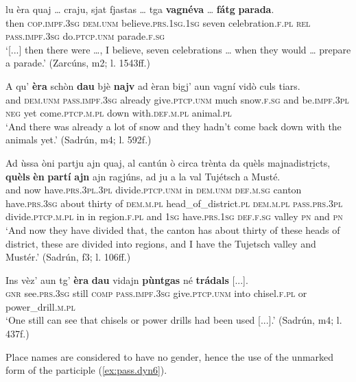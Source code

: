 \ea
\label{ex:pass.dyn5}
\gll    [...] lu èra quaj … craju, sjat fjastas … tga \textbf{vagnéva} … \textbf{fátg} \textbf{parada}.\\
{} then \textsc{cop.impf.3sg} \textsc{dem.unm} {} believe.\textsc{prs.1sg.1sg} seven celebration.\textsc{f.pl} {} \textsc{rel} \textsc{pass.impf.3sg} {} do.\textsc{ptcp.unm} parade.\textsc{f.sg}\\
\glt `[...] then there were …, I believe, seven celebrations … when they would … prepare a parade.' (Zarcúns, m2; l. 1543ff.)
\z

\ea
\label{ex:pass.stat1}
\gll A qu' \textbf{èra} schòn \textbf{dau} bjè \textbf{najv} ad èran bigj’ aun vagní vidò culs tiars.\\  
and \textsc{dem.unm} \textsc{pass.impf.3sg} already give.\textsc{ptcp.unm} much snow.\textsc{f.sg} and be.\textsc{impf.3pl} \textsc{neg} yet come.\textsc{ptcp.m.pl} down with.\textsc{def.m.pl} animal.\textsc{pl} \\
\glt `And there was already a lot of snow and they hadn’t come back down with the animals yet.' (Sadrún, m4; l. 592f.)
\z

\ea
\label{ex:pass.stat2}
\gll Ad ùssa òni partju ajn quaj, al cantún ò circa trènta da quèls majnadistri̱cts, \textbf{quèls} \textbf{èn} \textbf{partí} \textbf{ajn} ajn ragjúns, ad ju a la val Tujétsch a Musté.\\
and now have.\textsc{prs.3pl.3pl} divide.\textsc{ptcp.unm} in \textsc{dem.unm} \textsc{def.m.sg} canton  have.\textsc{prs.3sg} about thirty of \textsc{dem.m.pl} head\_of\_district.\textsc{pl} \textsc{dem.m.pl} \textsc{pass.prs.3pl} divide.\textsc{ptcp.m.pl} in in region.\textsc{f.pl} and \textsc{1sg} have.\textsc{prs.1sg} \textsc{def.f.sg} valley \textsc{pn} and \textsc{pn}\\
\glt `And now they have divided that, the canton has about thirty of these heads of district, these are divided into regions, and I have the Tujetsch valley and Mustér.' (Sadrún, f3; l. 106ff.)
\z

\ea
\label{ex:pass.stat3}
\gll Ins vèz’ aun tg’ \textbf{èra} \textbf{dau} vidajn \textbf{pùntgas} né \textbf{trádals} [...].   \\
\textsc{gnr} see.\textsc{prs.3sg} still \textsc{comp} \textsc{pass.impf.3sg} give.\textsc{ptcp.unm} into chisel.\textsc{f.pl} or power\_drill.\textsc{m.pl}\\
\glt `One still can see that chisels or power drills had been used [...].' (Sadrún, m4; l. 437f.)
\z

Place names are considered to have no gender, hence the use of the unmarked form of the participle (\ref{ex:pass.dyn6}).

